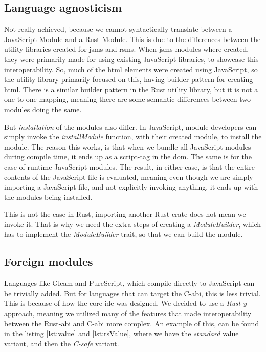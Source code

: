 \subsection{Language agnosticism}

Not really achieved, because we cannot syntactically translate between a
JavaScript Module and a Rust Module. This is due to the differences between the
utility libraries created for \gls*{jsms} and \gls*{rsms}. When \gls*{jsms} modules
where created, they were primarily made for using existing JavaScript libraries,
to showcase this interoperability. So, much of the \gls*{html} elements were
created using JavaScript, so the utility library primarily focused on this,
having builder pattern for creating \gls*{html}. There is a similar builder
pattern in the Rust utility library, but it is not a one-to-one mapping, meaning
there are some semantic differences between two modules doing the same.

But \textit{installation} of the modules also differ. In JavaScript, module
developers can simply invoke the \textit{installModule} function, with their
created module, to install the module. The reason this works, is that when we
bundle all JavaScript modules during compile time, it ends up as a script-tag in
the \gls*{dom}. The same is for the case of runtime JavaScript modules. The
result, in either case, is that the entire contents of the JavaScript file is
evaluated, meaning even though we are simply importing a JavaScript file, and
not explicitly invoking anything, it ends up with the modules being installed.

This is not the case in Rust, importing another Rust crate does not mean we
invoke it. That is why we need the extra steps of creating a
\textit{ModuleBuilder}, which has to implement the \textit{ModuleBuilder} trait,
so that we can build the module.

\subsection{Foreign modules}

Languages like Gleam and PureScript, which compile directly to JavaScript can
be trivially added. But for languages that can target the C-\gls*{abi}, this is
less trivial. This is because of how the core-\gls*{ide} was designed. We decided
to use a \textit{Rust-y} approach, meaning we utilized many of the features that
made interoperability between the Rust-\gls*{abi} and C-\gls*{abi} more complex.
An example of this, can be found in the listing \ref{lst:value} and
\ref{lst:rsValue}, where we have the \textit{standard} value variant, and then
the \textit{C-safe} variant.

